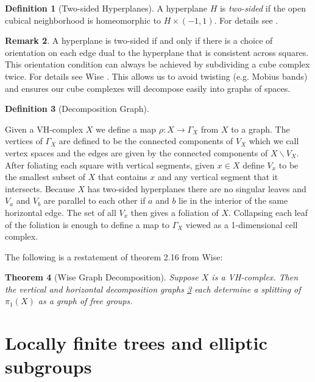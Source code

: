 \documentclass[12pt,parskip=full]{report}
\theoremstyle{plain}
\newtheorem{thm}{Theorem}[section]
\theoremstyle{definition}
\newtheorem{rmk}[thm]{Remark}
\newtheorem{dfn}[thm]{Definition}
\begin{document}
\begin{dfn}
    [Two-sided Hyperplanes]
    A hyperplane \(H\) is \emph{two-sided} if the open cubical neighborhood is homeomorphic to \(H\times (-1,1)\). For details see \cite{haglundwise}.
\end{dfn}

\begin{rmk}
    A hyperplane is two-sided if and only if there is a choice of orientation on each edge dual to the hyperplane that is consistent across squares. This orientation condition can always be achieved by subdividing a cube complex twice. For details see Wise \cite{wisecsc}. This allows us to avoid twisting (e.g. Mobius bands) and ensures our cube complexes will decompose easily into graphs of spaces.
\end{rmk}

\begin{dfn}
    [Decomposition Graph]
    \label{dfn:decompositiongraph}
    
    Given a VH-complex \(X\) we define a map \(\rho: X\to \Gamma_X\) from \(X\) to a graph. The vertices of \(\Gamma_X\) are defined to be the connected components of \(V_X\) which we call vertex spaces and the edges are given by the connected components of \(X\smallsetminus V_X\). After foliating each square with vertical segments, given \(x\in X\) define \(V_x\) to be the smallest subset of \(X\) that contains \(x\) and any vertical segment that it intersects. Because \(X\) has two-sided hyperplanes there are no singular leaves and \(V_a\) and \(V_b\) are parallel to each other if \(a\) and \(b\) lie in the interior of the same horizontal edge. The set of all \(V_x\) then gives a foliation of \(X\). Collapsing each leaf of the foliation is enough to define a map to \(\Gamma_X\) viewed as a 1-dimensional cell complex. 
\end{dfn}

The following is a restatement of theorem 2.16 \cite{wisethesis} from Wise:
\begin{thm}[Wise Graph Decomposition]
\label{thm:wisegraph}
Suppose \(X\) is a VH-complex. Then the vertical and horizontal decomposition graphs \ref{dfn:decompositiongraph} each determine a splitting of \(\pi_1(X)\) as a graph of free groups. 
\end{thm}

\chapter{Locally finite trees and elliptic subgroups}
\end{document}
